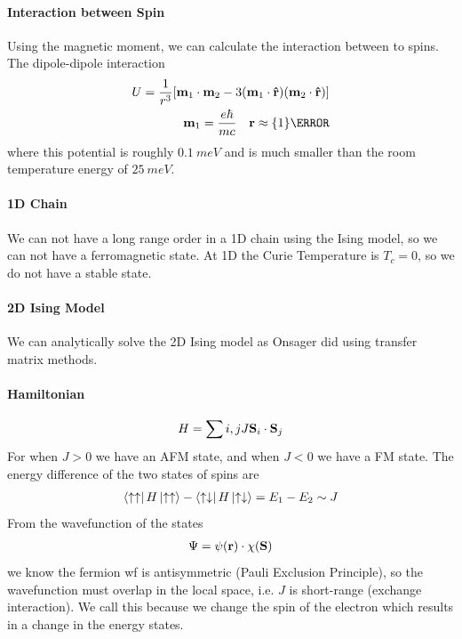 \documentclass[../main.tex]{subfiles}
\begin{document}
\paragraph*{Interaction between Spin}
Using the magnetic moment, we can calculate the interaction between to spins. The dipole-dipole
interaction
\begin{align*}
    U = \frac{1}{r^3} [\vb m_1 \cdot \vb m_2 - 3(\vb m_1 \cdot \vu r)(\vb m_2 \cdot \vu r)] \\
    \quad \vb m_1 = \frac{e\hbar}{mc} \quad  \vb r \approx \qty{1}{\angstrom}
\end{align*}
where this potential is roughly $\qty{0.1}{meV}$ and is much smaller than the room temperature
energy of $\qty{25}{meV}$. 

\paragraph*{1D Chain} We can not have a long range order in a 1D chain using the Ising model, so
we can not have a ferromagnetic state. At 1D the Curie Temperature is $T_c = 0$, so we do not 
have a stable state. 

\paragraph*{2D Ising Model} We can analytically solve the 2D Ising model as Onsager did using
transfer matrix methods.

\paragraph*{Hamiltonian}
\begin{align*}
    H = \sum{i,j} J \vb S_i \cdot \vb S_j 
\end{align*}
For when $J >0$ we have an AFM state, and when $J < 0$ we have a FM state. The energy difference
of the two states of spins are
\begin{align*}
    \bra{\uparrow \uparrow} H \ket{\uparrow \uparrow} - \bra{\uparrow \downarrow} H \ket{\uparrow \downarrow} = E_1 - E_2 \sim J
\end{align*}
From the wavefunction of the states
\begin{align*}
    \Psi = \psi(\vb r) \cdot \chi(\vb S)
\end{align*}
we know the fermion wf is antisymmetric (Pauli Exclusion Principle), so the wavefunction must
overlap in the local space, i.e. $J$ is short-range (exchange interaction). We call this because we
change the spin of the electron which results in a change in the energy states.
\end{document}
